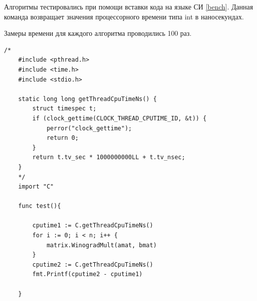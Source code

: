 Алгоритмы тестировались при помощи вставки кода на языке СИ \ref{bench}. Данная команда возвращает значения процессорного времени типа int в наносекундах.

Замеры времени для каждого алгоритма проводились 100 раз.

\begin{lstlisting}[label=bench,caption=Пример теста эффективности]
	/*
	#include <pthread.h>
	#include <time.h>
	#include <stdio.h>
	
	static long long getThreadCpuTimeNs() {
		struct timespec t;
		if (clock_gettime(CLOCK_THREAD_CPUTIME_ID, &t)) {
			perror("clock_gettime");
			return 0;
		}
		return t.tv_sec * 1000000000LL + t.tv_nsec;
	}
	*/
	import "C"	
	
	func test(){
		
		cputime1 := C.getThreadCpuTimeNs()
		for i := 0; i < n; i++ {
			matrix.WinogradMult(amat, bmat)
		}
		cputime2 := C.getThreadCpuTimeNs()
		fmt.Printf(cputime2 - cputime1)
		
	}
\end{lstlisting}

